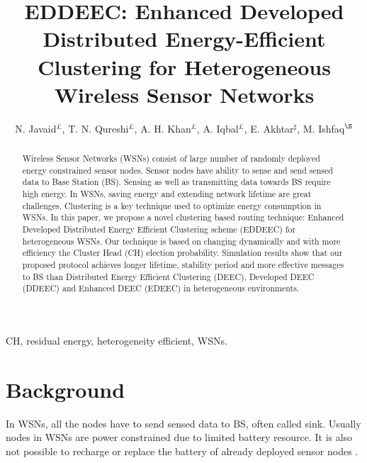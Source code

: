 \documentclass[3p,times,procedia]{elsarticle}
\begin{document}
\begin{frontmatter}
\title{EDDEEC: Enhanced Developed Distributed Energy-Efficient\\ Clustering for Heterogeneous Wireless Sensor Networks}

\author{N. Javaid$^{\pounds}$, T. N. Qureshi$^{\pounds}$, A. H. Khan$^{\pounds}$, A. Iqbal$^{\pounds}$, E. Akhtar$^{\sharp}$, M. Ishfaq$^{\S}$}

\address{$^{\pounds}$COMSATS Institute of Information Technology, Islamabad, Pakistan. \\
        $^{\sharp}$University of Bedfordshire, Luton, UK.\\
        $^{\S}$King Abdulaziz University, Rabigh, Saudi Arabia.}

\begin{abstract}
Wireless Sensor Networks (WSNs) consist of large number of randomly deployed energy constrained sensor nodes. Sensor nodes have ability to sense and send sensed data to Base Station (BS). Sensing as well as transmitting data towards BS require high energy. In WSNs, saving energy and extending network lifetime are great challenges. Clustering is a key technique used to optimize energy consumption in WSNs. In this paper, we propose a novel clustering based routing technique: Enhanced Developed Distributed Energy Efficient Clustering scheme (EDDEEC) for heterogeneous WSNs. Our technique is based on changing dynamically and with more efficiency the Cluster Head (CH) election probability. Simulation results show that our proposed protocol achieves longer lifetime, stability period and more effective messages to BS than Distributed Energy Efficient Clustering (DEEC), Developed DEEC (DDEEC) and Enhanced DEEC (EDEEC) in heterogeneous environments.
\end{abstract}
\begin{keyword}
CH, residual energy, heterogeneity efficient, WSNs.
\end{keyword}
\end{frontmatter}
\section{Background}
In WSNs, all the nodes have to send sensed data to BS, often called sink. Usually nodes in WSNs are power constrained due to limited battery resource. It is also not possible to recharge or replace the battery of already deployed sensor nodes \cite{talha,talha 1, Reference 1}.
\end{document}
